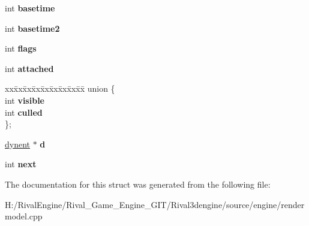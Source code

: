 \begin{DoxyCompactItemize}
int {\bfseries basetime}
\item 
\mbox{\label{structbatchedmodel_a26aab62945e68fc31ff8816458786a9a}} 
int {\bfseries basetime2}
\item 
\mbox{\label{structbatchedmodel_a393b803963a38ada0dd70683c305d47a}} 
int {\bfseries flags}
\item 
\mbox{\label{structbatchedmodel_ac39f64af343646dfb21e2b5387639994}} 
int {\bfseries attached}
\item 
\mbox{\label{structbatchedmodel_ab5b047d76a07b3851f74153c365f71b3}} 
\begin{tabbing}
xx\=xx\=xx\=xx\=xx\=xx\=xx\=xx\=xx\=\kill
union \{\\
\>int {\bfseries visible}\\
\>int {\bfseries culled}\\
\}; \\

\end{tabbing}\item 
\mbox{\label{structbatchedmodel_ae092f6fa49d97b73dd512ebf3b8c0804}} 
\hyperlink{structdynent}{dynent} $\ast$ {\bfseries d}
\item 
\mbox{\label{structbatchedmodel_ae871731e234b6cf25858d1a74380acdb}} 
int {\bfseries next}
\end{DoxyCompactItemize}


The documentation for this struct was generated from the following file\+:\begin{DoxyCompactItemize}
\item 
H\+:/\+Rival\+Engine/\+Rival\+\_\+\+Game\+\_\+\+Engine\+\_\+\+G\+I\+T/\+Rival3dengine/source/engine/rendermodel.\+cpp\end{DoxyCompactItemize}
